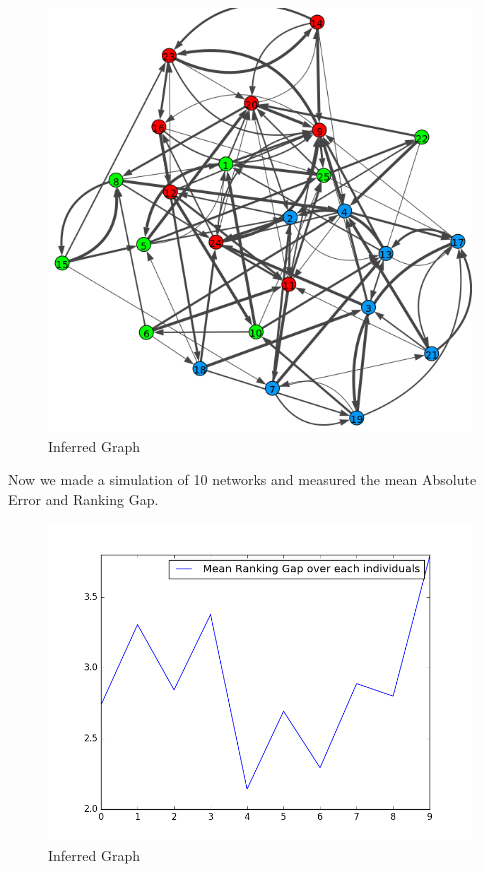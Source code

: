 \documentclass[12pt]{ociamthesis}  %
\begin{document}
	\begin{figure}
		\centering
		\includegraphics[width=\textwidth,height=\textheight,keepaspectratio]{OptimizationPlotFixedPrior}
		\caption{Inferred Graph}
		\label{label-image11}
	\end{figure}
	
	Now we made a simulation of 10 networks and measured the mean Absolute Error and Ranking Gap.
	
	\begin{figure}
		\centering
		\includegraphics[width=\textwidth,height=\textheight,keepaspectratio]{SimulationGap}
		\caption{Inferred Graph}
		\label{label-image12}
	\end{figure}
	
\end{document}

